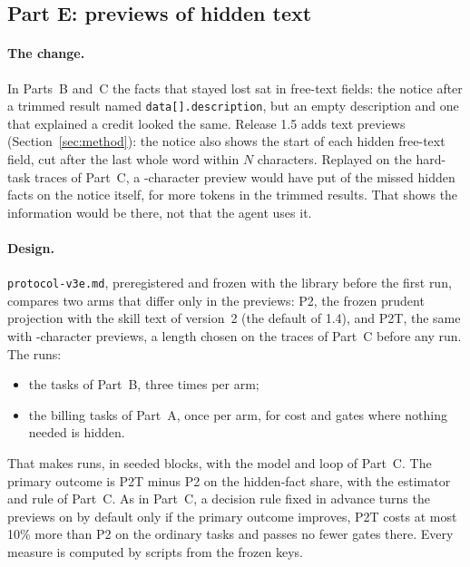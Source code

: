 \subsection{Part E: previews of hidden text}
\label{sec:s4e}

\paragraph{The change.} In Parts~B and~C the facts that stayed lost sat in free-text fields: the notice after a
trimmed result named \texttt{data[].description}, but an empty description and one that explained a credit looked
the same. Release 1.5 adds text previews (Section~\ref{sec:method}): the notice also shows the start of each hidden
free-text field, cut after the last whole word within $N$ characters. Replayed on the \SfourEHintTraces{} hard-task
traces of Part~C, a \SfourEPreview{}-character preview would have put \SfourEHintFlagged{} of the
\SfourEHintMissed{} missed hidden facts on the notice itself, for \SfourEHintShare{} more tokens in the trimmed
results. That shows the information would be there, not that the agent uses it.

\paragraph{Design.} \texttt{protocol-v3e.md}, preregistered and frozen with the library before the first run,
compares two arms that differ only in the previews: P2, the frozen prudent projection with the skill text of
version~2 (the default of 1.4), and P2T, the same with \SfourEPreview{}-character previews, a length chosen on the
traces of Part~C before any run. The runs:
\begin{itemize}
\item the \SfourEHardTasks{} tasks of Part~B, three times per arm;
\item the \SfourEOrdinaryTasks{} billing tasks of Part~A, once per arm, for cost and gates where nothing needed is
hidden.
\end{itemize}
That makes \SfourERuns{} runs, in seeded blocks, with the model and loop of Part~C. The primary outcome is P2T minus
P2 on the hidden-fact share, with the estimator and rule of Part~C. As in Part~C, a decision rule fixed in advance
turns the previews on by default only if the primary outcome improves, P2T costs at most 10\% more than P2 on the
ordinary tasks and passes no fewer gates there. Every measure is computed by scripts from the frozen keys.

